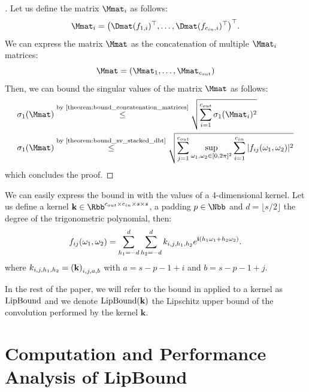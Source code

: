 \begin{proof}[]
Let us define the matrix $\Mmat_i$ as follows:
\begin{equation}
    \Mmat_i = \leftmat \Dmat(f_{1, i})^\top, \dots, \Dmat(f_{\cin, i})^\top \rightmat^\top .
\end{equation}
We can express the matrix $\Mmat$ as the concatenation of multiple $\Mmat_i$ matrices:
\begin{equation}
    \Mmat = \leftmat \Mmat_1, \dots, \Mmat_{\cout} \rightmat
\end{equation}
Then, we can bound the singular values of the matrix $\Mmat$ as follows:
\begin{align}
    \sigma_1\left(\Mmat\right) &\stackrel{\text{by \Cref{theorem:bound_concatenation_matrices}}}{\leq} \sqrt{\sum_{i=1}^{\cout} \sigma_1(\Mmat_i)^2} \\
    \sigma_1\left(\Mmat\right) &\stackrel{\text{by \Cref{theorem:bound_sv_stacked_dbt}}}{\leq} \sqrt{\sum_{j=1}^{\cout} \sup_{\omega_1, \omega_2 \in [0, 2\pi]^2} \sum_{i=1}^{\cin} |f_{ij}(\omega_1, \omega_2)|^2 }
\end{align}
which concludes the proof. 
\end{proof}



We can easily express the bound in  with the values of a 4-dimensional kernel.
Let us define a kernel $\mathbf{k} \in \Rbb^{\cout \times \cin \times s \times s}$, a padding $p \in \Nbb$ and $d = \lfloor s / 2 \rfloor$ the degree of the trigonometric polynomial, then:
\begin{equation}
  f_{ij}(\omega_1, \omega_2) = \sum_{h_1 = -d}^d \sum_{h_2 = -d}^d k_{i, j, h_1,h_2} e^{\mathbf{i} (h_1 \omega_1 + h_2 \omega_2)}.
\end{equation}
where $k_{i, j, h_1,h_2} = \leftmat \mathbf{k} \rightmat_{i, j, a, b}$ with $a =  s - p - 1 + i$ and $b =  s - p - 1 + j$.

In the rest of the paper, we will refer to the bound in  applied to a kernel as $\mathrm{LipBound}$ and we denote $\mathrm{LipBound}(\mathbf{k})$ the Lipschitz upper bound of the convolution performed by the kernel $\mathbf{k}$. 


\section{Computation and Performance Analysis of LipBound}
\label{section:ch5-computation_and_performance_analysis_of_lipbound}

